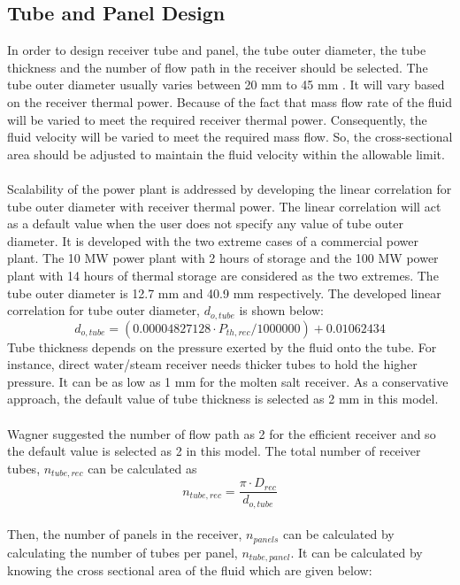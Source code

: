 \subsection{Tube and Panel Design}
In order to design receiver tube and panel, the tube outer diameter, the tube thickness and the number of flow path in the receiver should be selected. The tube outer diameter usually varies between 20 mm to 45 mm \cite{Lata.2008}. It will vary based on the receiver thermal power. Because of the fact that mass flow rate of the fluid will be varied to meet the required receiver thermal power. Consequently, the fluid velocity will be varied to meet the required mass flow. So, the cross-sectional area should be adjusted to maintain the fluid velocity within the allowable limit.\\\\
Scalability of the power plant is addressed by developing the linear correlation for tube outer diameter with receiver thermal power. The linear correlation will act as a default value when the user does not specify any value of tube outer diameter. It is developed with the two extreme cases of a commercial power plant. The 10 MW power plant with 2 hours of storage and the 100 MW power plant with 14 hours of thermal storage are considered as the two extremes. The tube outer diameter is 12.7 mm \cite{Stine.2001} and 40.9 mm \cite{Tilley.2014} respectively. The developed linear correlation for tube outer diameter, $d_{o,tube}$ is shown below:
\begin{equation}
	d_{o,tube} = (0.00004827128 \cdot P_{th,rec}/1000000) + 0.01062434
\end{equation}
Tube thickness depends on the pressure exerted by the fluid onto the tube. For instance, direct water/steam receiver needs thicker tubes to hold the higher pressure. It can be as low as 1 mm for the molten salt receiver. As a conservative approach, the default value of tube thickness is selected as 2 mm in this model. \\\\
Wagner \cite{Wagner.2008} suggested the number of flow path as 2 for the efficient receiver and so the default value is selected as 2 in this model. The total number of receiver tubes, $n_{tube,rec}$ can be calculated as
\begin{equation}
	n_{tube,rec} = \frac{\pi \cdot D_{rec}} {d_{o,tube}}
\end{equation}\\
Then, the number of panels in the receiver, $n_{panels}$ can be calculated by calculating the number of tubes per panel, $n_{tube,panel}$. It can be calculated by knowing the cross sectional area of the fluid which are given below:
